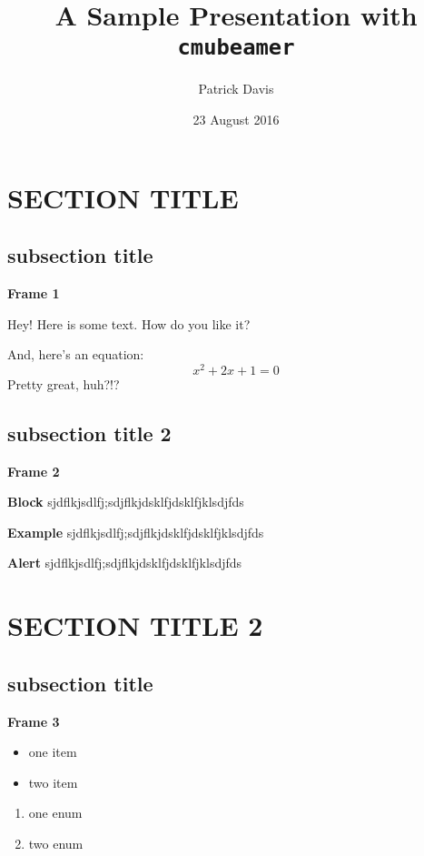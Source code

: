 \documentclass[aspectratio=169]{beamer}
\title[Sample Presentation]{\bfseries A Sample Presentation with {\tt cmubeamer}}
\author{Patrick Davis}
\institute{Mount Pleasant, MI} %
\date{23 August 2016}
\begin{document}
\maketitleframe


\section{SECTION TITLE}
\subsection{subsection title}

\begin{frame}{\bfseries Frame 1}

Hey!  Here is some text.  How do you like it?

And, here's an equation:
\[
x^{2} + 2x + 1 = 0
\]
Pretty great, huh?!?

\end{frame}

\subsection{subsection title 2}
\begin{frame}{\bfseries Frame 2}

\begin{block}{\bfseries Block}
sjdflkjsdlfj;sdjflkjdsklfjdsklfjklsdjfds
\end{block}

\begin{exampleblock}{\bfseries Example}
sjdflkjsdlfj;sdjflkjdsklfjdsklfjklsdjfds
\end{exampleblock}

\begin{alertblock}{\bfseries Alert}
sjdflkjsdlfj;sdjflkjdsklfjdsklfjklsdjfds
\end{alertblock}

\end{frame}

\section{SECTION TITLE 2}
\subsection{subsection title}

\begin{frame}{\bfseries Frame 3}

\begin{itemize}
\item one item
\item two item
\end{itemize}

\begin{enumerate}
\item one enum
\item two enum
\end{enumerate}

\end{frame}



\end{document}
